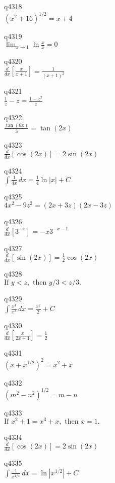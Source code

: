 q4318\\
\(\displaystyle (x^2+16)^{1/2} = x+4 \)

q4319\\
\(\displaystyle \lim_{x \rightarrow 1} \ln \frac{x}{x} = 0 \)

q4320\\
\(\displaystyle \frac{d}{dx} \left [ \frac{x}{x+1} \right ] = \frac{1}{(x+1)^2} \)

q4321\\
\(\displaystyle \frac{1}{z} - z = \frac{1-z^2}{z} \)

q4322\\
\(\displaystyle \frac{\tan(6x)}{3} = \tan(2x) \)

q4323\\
\(\displaystyle \frac{d}{dx} [ \cos(2x)] = 2\sin(2x) \)

q4324\\
\(\displaystyle \int \frac{1}{4x}\,dx = \frac{1}{4} \ln |x| + C \)

q4325\\
\(\displaystyle 4x^2 - 9z^2 = (2x+3z)(2x-3z) \)

q4326\\
\(\displaystyle \frac{d}{dx} [3^{-x}] = -x3^{-x-1} \)

q4327\\
\(\displaystyle \frac{d}{dx}[\sin(2x)] = \frac{1}{2} \cos(2x) \)

q4328\\
\(\displaystyle \text{If } y < z, \text{ then } y/3 < z/3. \)

q4329\\
\(\displaystyle \int \frac{x^4}{x^3} \, dx = \frac{x^2}{2} + C \)

q4330\\
\(\displaystyle \frac{d}{dx} \left [ \frac{x}{2x+1} \right ] = \frac{1}{2} \)

q4331\\
\(\displaystyle (x+x^{1/2})^2 = x^2 + x \)

q4332\\
\(\displaystyle (m^2 - n^2)^{1/2} = m - n \)

q4333\\
\(\displaystyle \text{If } x^2 + 1 = x^3 + x, \text{ then } x = 1. \)

q4334\\
\(\displaystyle \frac{d}{dx} [\cos(2x)] = 2\sin(2x) \)

q4335\\
\(\displaystyle \int \frac{1}{x^{1/x}} \, dx = \ln | x^{1/2} | + C \)

